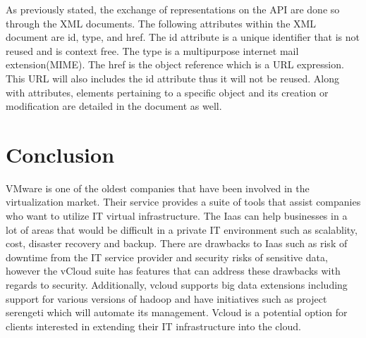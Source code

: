 \documentclass[9pt,twocolumn,twoside]{../../styles/osajnl}
\begin{document}
As previously stated, the exchange of representations on the API are
done so through the XML documents.  The following attributes within
the XML document are id, type, and href\cite{www-api}.  The id
attribute is a unique identifier that is not reused and is context
free.  The type is a multipurpose internet mail extension(MIME).  The
href is the object reference which is a URL expression.  This URL will
also includes the id attribute thus it will not be reused.  Along with
attributes, elements pertaining to a specific object and its creation
or modification are detailed in the document as well.




\section{Conclusion}

VMware is one of the oldest companies that have been involved in the
virtualization market.  Their service provides a suite of tools that
assist companies who want to utilize IT virtual infrastructure.  The
Iaas can help businesses in a lot of areas that would be difficult in
a private IT environment such as scalablity, cost, disaster recovery
and backup.  There are drawbacks to Iaas such as risk of downtime from
the IT service provider and security risks of sensitive data, however
the vCloud suite has features that can address these drawbacks with
regards to security.  Additionally, vcloud supports big data
extensions including support for various versions of hadoop and have
initiatives such as project serengeti which will automate its
management. Vcloud is a potential option for clients interested in
extending their IT infrastructure into the cloud.



\end{document}
